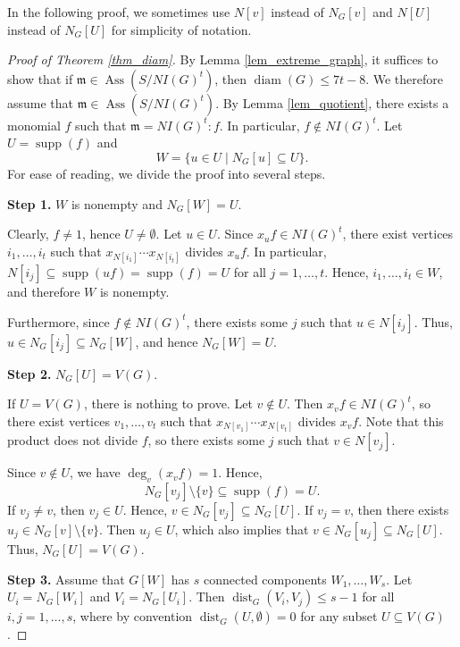 \documentclass[12pt,reqno,twoside]{amsart}
\newcommand{\mm}{\mathfrak m}
\DeclareMathOperator{\diam}{diam}
\DeclareMathOperator{\Ass}{Ass}
\DeclareMathOperator{\dist}{dist}
\DeclareMathOperator{\supp}{supp}
\theoremstyle{definition}
\theoremstyle{plain}
\theoremstyle{remark}
\numberwithin{equation}{section}
\begin{document}
In the following proof, we sometimes use $N[v]$ instead of $N_G[v]$ and $N[U]$ instead of $N_G[U]$ for simplicity of notation.
\begin{proof}[Proof of Theorem \ref{thm_diam}]
By Lemma \ref{lem_extreme_graph}, it suffices to show that if $\mm \in \Ass(S/NI(G)^t)$, then $\diam(G) \leq 7t - 8$. We therefore assume that $\mm \in \Ass(S/NI(G)^t)$. By Lemma \ref{lem_quotient}, there exists a monomial $f$ such that $\mm = NI(G)^t : f$. In particular, $f \notin NI(G)^t$. Let $U = \supp(f)$ and 
\[
W = \{u \in U \mid N_G[u] \subseteq U\}.
\]
For ease of reading, we divide the proof into several steps.

\medskip

\noindent \textbf{Step 1.} $W$ is nonempty and $N_G[W] = U$.

Clearly, $f \neq 1$, hence $U \neq \emptyset$. Let $u \in U$. Since $x_u f \in NI(G)^t$, there exist vertices $i_1, \ldots, i_t$ such that $x_{N[i_1]} \cdots x_{N[i_t]}$ divides $x_u f$. In particular, $N[i_j] \subseteq \supp(uf) = \supp(f) = U$ for all $j = 1, \ldots, t$. Hence, $i_1, \ldots, i_t \in W$, and therefore $W$ is nonempty.

Furthermore, since $f \notin NI(G)^t$, there exists some $j$ such that $u \in N[i_j]$. Thus, $u \in N_G[i_j] \subseteq N_G[W]$, and hence $N_G[W] = U$.

\medskip

\noindent \textbf{Step 2.} $N_G[U] = V(G)$.

If $U = V(G)$, there is nothing to prove. Let $v \notin U$. Then $x_v f \in NI(G)^t$, so there exist vertices $v_1, \ldots, v_t$ such that $x_{N[v_1]} \cdots x_{N[v_t]}$ divides $x_v f$. Note that this product does not divide $f$, so there exists some $j$ such that $v \in N[v_j]$.

Since $v \notin U$, we have $\deg_v(x_v f) = 1$. Hence,
\[
N_G[v_j] \setminus \{v\} \subseteq \supp(f) = U.
\]
If $v_j \neq v$, then $v_j \in U$. Hence, $v \in N_G[v_j] \subseteq N_G[U]$. If $v_j = v$, then there exists $u_j \in N_G[v] \setminus \{v\}$. Then $u_j \in U$, which also implies that $v \in N_G[u_j] \subseteq N_G[U]$. Thus, $N_G[U] = V(G)$.

\medskip

\noindent \textbf{Step 3.} Assume that $G[W]$ has $s$ connected components $W_1, \ldots, W_s$. Let $U_i = N_G[W_i]$ and $V_i = N_G[U_i]$. Then $\dist_G(V_i, V_j) \leq s - 1$ for all $i, j = 1, \ldots, s$, where by convention $\dist_G(U, \emptyset) = 0$ for any subset $U \subseteq V(G)$.


\end{proof}
\end{document}
